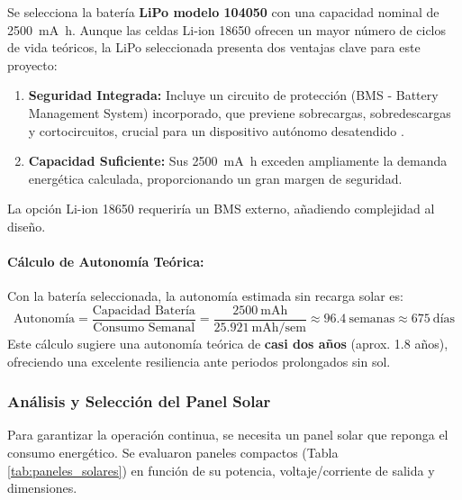  Se selecciona la batería \textbf{LiPo modelo 104050} con una capacidad nominal de \SI{2500}{\milli\ampere\hour}. Aunque las celdas Li-ion 18650 ofrecen un mayor número de ciclos de vida teóricos, la LiPo seleccionada presenta dos ventajas clave para este proyecto:
\begin{enumerate}
    \item \textbf{Seguridad Integrada:} Incluye un circuito de protección (BMS - Battery Management System) incorporado, que previene sobrecargas, sobredescargas y cortocircuitos, crucial para un dispositivo autónomo desatendido \cite{batteryLipo104050}.
    \item \textbf{Capacidad Suficiente:} Sus \SI{2500}{\milli\ampere\hour} exceden ampliamente la demanda energética calculada, proporcionando un gran margen de seguridad.
\end{enumerate}
La opción Li-ion 18650 requeriría un BMS externo, añadiendo complejidad al diseño.

\paragraph*{Cálculo de Autonomía Teórica:} 

Con la batería seleccionada, la autonomía estimada sin recarga solar es:
\begin{equation} \label{eq:autonomia}
\text{Autonomía} = \frac{\text{Capacidad Batería}}{\text{Consumo Semanal}} = \frac{\SI{2500}{\milli\ampere\hour}}{\SI{25.921}{\milli\ampere\hour / \text{sem}}} \approx \boxed{\num{96.4}~\text{semanas}} \approx \num{675}~\text{días}
\end{equation}
Este cálculo sugiere una autonomía teórica de \textbf{casi dos años} (aprox. 1.8 años), ofreciendo una excelente resiliencia ante periodos prolongados sin sol.

\subsubsection{Análisis y Selección del Panel Solar}
\label{subsubsec:analisis_y_seleccion_del_panel_solar}
Para garantizar la operación continua, se necesita un panel solar que reponga el consumo energético. Se evaluaron paneles compactos (Tabla \ref{tab:paneles_solares}) en función de su potencia, voltaje/corriente de salida y dimensiones.

